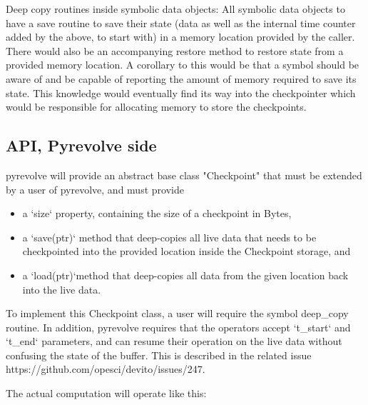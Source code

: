 \documentclass[sigconf]{acmart}
\begin{document}
Deep copy routines inside symbolic data objects: All symbolic data objects to have a save routine to
save their state (data as well as the internal time counter added by the above, to start with) in a
memory location provided by the caller. There would also be an accompanying restore method to
restore state from a provided memory location. A corollary to this would be that a symbol should be
aware of and be capable of reporting the amount of memory required to save its state. This knowledge
would eventually find its way into the checkpointer which would be responsible for allocating memory
to store the checkpoints.

\subsection{API, Pyrevolve side}

pyrevolve will provide an abstract base class "Checkpoint" that must be extended by a user of
pyrevolve, and must provide

\begin{itemize}
\item a `size` property, containing the size of a checkpoint in Bytes,
\item a `save(ptr)` method that deep-copies all live data that needs to be checkpointed into the
provided location inside the Checkpoint storage, and
\item a `load(ptr)`method that deep-copies all data from the given location back into the live data.
\end{itemize}

To implement this Checkpoint class, a user will require the symbol deep\_copy routine. In addition,
pyrevolve requires that the operators accept `t\_start` and `t\_end` parameters, and can resume
their operation on the live data without confusing the state of the buffer. This is described in the
related issue https://github.com/opesci/devito/issues/247.

The actual computation will operate like this:
\end{document}
